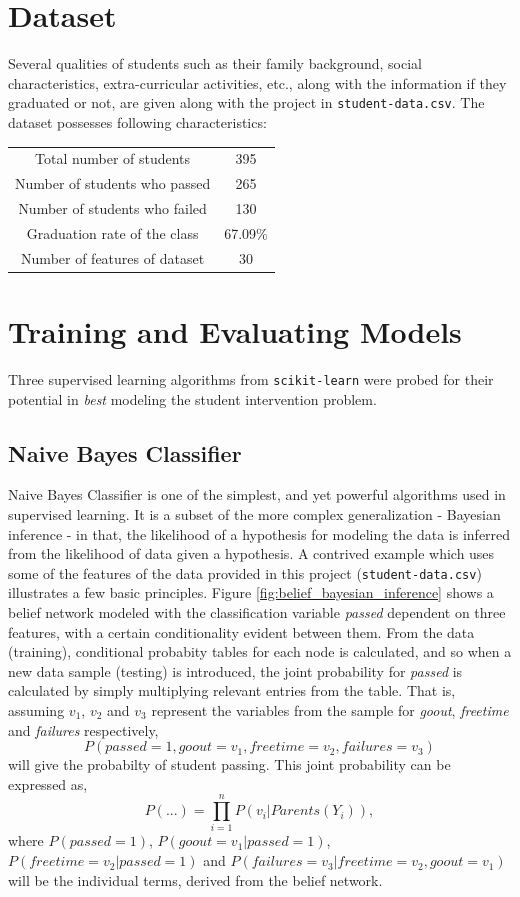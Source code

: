 \documentclass{article}
\begin{document}
	\section{Dataset}
	Several qualities of students such as their family background, social characteristics, extra-curricular activities, etc., along with the information if they graduated or not, are given along with the project in \texttt{student-data.csv}. The dataset possesses following characteristics:
	\begin{center}
		\begin{tabular}{c|c}
			\toprule
			Total number of students & 395 \\
			Number of students who passed & 265 \\
			Number of students who failed & 130  \\
			Graduation rate of the class & 67.09\% \\
			Number of features of dataset & 30 \\
			\bottomrule
		\end{tabular}
		\label{tab:data_characteristics}
	\end{center}
	
	
	\section{Training and Evaluating Models}
	Three supervised learning algorithms from \texttt{scikit-learn} were probed for their potential in \emph{best} modeling the student intervention problem. 
	
	\subsection{Naive Bayes Classifier}
	Naive Bayes Classifier is one of the simplest, and yet powerful algorithms used in supervised learning. It is a subset of the more complex generalization - Bayesian inference - in that, the likelihood of a hypothesis for modeling the data is inferred from the likelihood of data given a hypothesis. A contrived example which uses some of the features of the data provided in this project (\texttt{student-data.csv}) illustrates a few basic principles. Figure \ref{fig:belief_bayesian_inference} shows a belief network modeled with the classification variable \emph{passed} dependent on three features, with a certain conditionality evident between them. From the data (training), conditional probabity tables for each node is calculated, and so when a new data sample (testing) is introduced, the joint probability for \emph{passed} is calculated by simply multiplying relevant entries from the table. That is, assuming $v_1$, $v_2$ and $v_3$ represent the variables from the sample for \emph{goout}, \emph{freetime} and \emph{failures} respectively, 
	\[P(passed=1, goout=v_1, freetime=v_2, failures=v_3)\] will give the probabilty of student passing. This joint probability can be expressed as, \[P(...) = \prod_{i=1}^{n}P(v_i|Parents(Y_i)),\] where $P(passed=1)$, $P(goout=v_1|passed=1)$, $P(freetime=v_2|passed=1)$ and $P(failures=v_3|freetime=v_2,goout=v_1)$ will be the individual terms, derived from the belief network.
	
\end{document}
